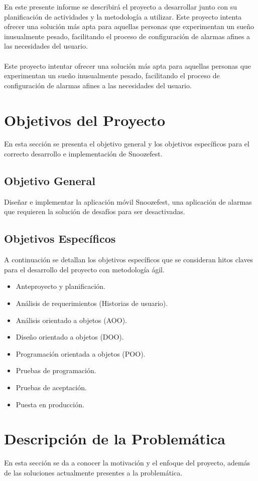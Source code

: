 \documentclass[letterpaper, 10pt]{article}
\begin{document}
En este presente informe se describirá el proyecto a desarrollar junto con su planificación de actividades y la metodología a utilizar. Este proyecto intenta ofrecer una solución más apta para aquellas personas que experimentan un sueño inusualmente pesado, facilitando el proceso de configuración de alarmas afines a las necesidades del usuario.
\\\\
Este proyecto intentar ofrecer una solución más apta para aquellas personas que experimentan un sueño inusualmente pesado, facilitando el proceso de configuración de alarmas afines a las necesidades del usuario.

\section{Objetivos del Proyecto}
En esta sección se presenta el objetivo general y los objetivos específicos para el correcto desarrollo e implementación de Snoozefest.
\subsection{Objetivo General}
Diseñar e implementar la aplicación móvil Snoozefest, una aplicación de alarmas que requieren la solución de desafíos para ser desactivadas.
\subsection{Objetivos Específicos}
A continuación se detallan los objetivos específicos que se consideran hitos claves para el desarrollo del proyecto con metodología ágil.
\begin{itemize}
	\item Anteproyecto y planificación.
	\item Análisis de requerimientos (Historias de usuario).
	\item Análisis orientado a objetos (AOO).
	\item Diseño orientado a objetos (DOO).
	\item Programación orientada a objetos (POO).
	\item Pruebas de programación.
	\item Pruebas de aceptación.
	\item Puesta en producción.
\end{itemize}

\section{Descripción de la Problemática}
En esta sección se da a conocer la motivación y el enfoque del proyecto, además de las soluciones actualmente presentes a la problemática.
\end{document}
